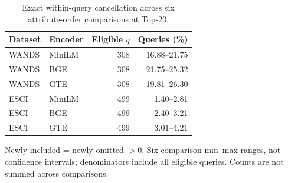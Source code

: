 \begin{table}[!t]
\centering
\caption{Exact within-query cancellation across six attribute-order comparisons at Top-20.}
\label{tab:revision-cancellation}
\small
\begin{tabular}{llrr}
\toprule
Dataset & Encoder & Eligible $q$ & Queries (\%) \\
\midrule
WANDS & MiniLM & 308 & 16.88--21.75 \\
WANDS & BGE & 308 & 21.75--25.32 \\
WANDS & GTE & 308 & 19.81--26.30 \\
\midrule
ESCI & MiniLM & 499 & 1.40--2.81 \\
ESCI & BGE & 499 & 2.40--3.21 \\
ESCI & GTE & 499 & 3.01--4.21 \\
\bottomrule
\end{tabular}
\par\smallskip
\begin{minipage}{\columnwidth}\small
Newly included = newly omitted $>0$. Six-comparison min--max ranges, not confidence intervals; denominators include all eligible queries. Counts are not summed across comparisons.
\end{minipage}
\end{table}

